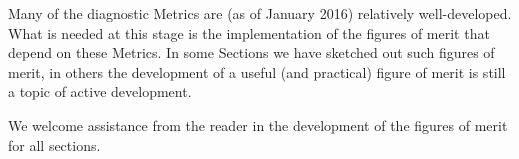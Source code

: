 Many of the diagnostic Metrics are (as of January 2016) relatively
well-developed. What is needed at this stage is the implementation of
the figures of merit that depend on these Metrics. In some Sections we
have sketched out such figures of merit, in others the development of
a useful (and practical) figure of merit is still a topic of active
development. 

We welcome assistance from the reader in the development of the
figures of merit for all sections. 






